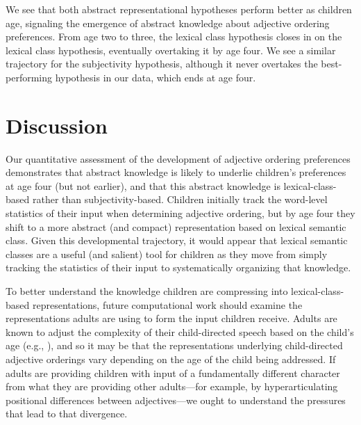 \documentclass[10pt]{article}
\begin{document}
We see that both abstract representational hypotheses perform better as children age, signaling the emergence of abstract knowledge about adjective ordering preferences. From age two to three, the lexical class hypothesis closes in on the lexical class hypothesis, eventually overtaking it by age four. We see a similar trajectory for the subjectivity hypothesis, although it never overtakes the best-performing hypothesis in our data, which ends at age four.
 
\section{Discussion}

Our quantitative assessment of the development of adjective ordering preferences demonstrates that abstract knowledge is likely to underlie children's preferences at age four (but not earlier), and that this abstract knowledge is lexical-class-based rather than subjectivity-based. Children initially track the word-level statistics of their input when determining adjective ordering, but by age four they shift to a more abstract (and compact) representation based on lexical semantic class. 
Given this developmental trajectory, it would appear that lexical semantic classes are a useful (and salient) tool for children as they move from simply tracking the statistics of their input to systematically organizing that knowledge. 

To better understand the knowledge children are compressing into lexical-class-based representations, future computational work should examine the representations adults are using to form the input children receive. 
Adults are known to adjust the complexity of their child-directed speech based on the child's age (e.g., \citealt{kunertetal2011}), and so it may be that the representations underlying child-directed adjective orderings vary depending on the age of the child being addressed. If adults are providing children with input of a fundamentally different character from what they are providing other adults---for example, by hyperarticulating positional differences between adjectives---we ought to understand the pressures that lead to that divergence.
\end{document}
